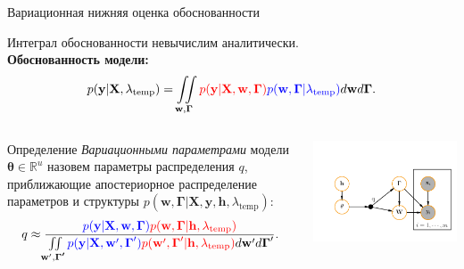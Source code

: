 \documentclass[usenames,dvipsnames,11pt,pdf,utf8,russian,aspectratio=43]{beamer}
\begin{document}
\begin{frame}{Вариационная нижняя оценка обоснованности} 
\footnotesize

Интеграл обоснованности невычислим аналитически.\\
\textbf{Обоснованность модели:}
\[
p(\mathbf{y}|\mathbf{X}, \lambda_\text{temp}) =
 \iint\limits_{\mathbf{w}, \boldsymbol{\Gamma}}  \textcolor{red}{p(\mathbf{y}|\mathbf{X},\mathbf{w},  \boldsymbol{\Gamma})} \textcolor{blue}{p(\mathbf{w}, \boldsymbol{\Gamma}| \lambda_\text{temp})}d\mathbf{w}d{\boldsymbol{\Gamma}}.                         
\]

\begin{columns}
\begin{column}{0.55\textwidth}
  
\begin{block}{Определение}
\textit{Вариационными параметрами} модели $\boldsymbol{\theta} \in \mathbb{R}^{{u}}$ назовем параметры распределения $q$, приближающие апостериорное распределение параметров и структуры $p(\mathbf{w}, \boldsymbol{\Gamma}|\mathbf{X}, \mathbf{y}, \mathbf{h}, \lambda_\text{temp})$:
\[
    q \approx  \frac{\textcolor{blue}{p(\mathbf{y}|\mathbf{X},\mathbf{w},\boldsymbol{\Gamma})}\textcolor{red}{p(\mathbf{w}, \boldsymbol{\Gamma}|\mathbf{h}, \lambda_\text{temp})}}{\iint\limits_{\mathbf{w}', \boldsymbol{\Gamma'}}\textcolor{blue}{p(\mathbf{y}|\mathbf{X},\mathbf{w}',\boldsymbol{\Gamma}')}\textcolor{red}{p(\mathbf{w}', \boldsymbol{\Gamma}'|\mathbf{h}, \lambda_\text{temp})}d\mathbf{w}'d\boldsymbol{\Gamma}'}.
\]
\end{block} 

\end{column}
\begin{column}{0.45\textwidth}  %
    \begin{center}
     \includegraphics[width=\textwidth]{plate.pdf}
     \end{center}
\end{column}
\end{columns}




\end{frame}
\end{document}
